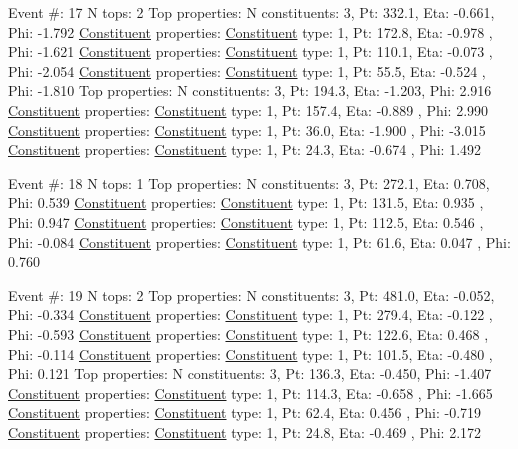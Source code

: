 \begin{DoxyCode}
Event #: 17
      N tops: 2
      Top properties: N constituents:   3,   Pt:  332.1,   Eta:  -0.661,   Phi:  -1.792
          \hyperlink{classConstituent}{Constituent} properties: \hyperlink{classConstituent}{Constituent} type:   1,   Pt:  172.8,   Eta:  -0.978
      ,   Phi:  -1.621
          \hyperlink{classConstituent}{Constituent} properties: \hyperlink{classConstituent}{Constituent} type:   1,   Pt:  110.1,   Eta:  -0.073
      ,   Phi:  -2.054
          \hyperlink{classConstituent}{Constituent} properties: \hyperlink{classConstituent}{Constituent} type:   1,   Pt:   55.5,   Eta:  -0.524
      ,   Phi:  -1.810
      Top properties: N constituents:   3,   Pt:  194.3,   Eta:  -1.203,   Phi:   2.916
          \hyperlink{classConstituent}{Constituent} properties: \hyperlink{classConstituent}{Constituent} type:   1,   Pt:  157.4,   Eta:  -0.889
      ,   Phi:   2.990
          \hyperlink{classConstituent}{Constituent} properties: \hyperlink{classConstituent}{Constituent} type:   1,   Pt:   36.0,   Eta:  -1.900
      ,   Phi:  -3.015
          \hyperlink{classConstituent}{Constituent} properties: \hyperlink{classConstituent}{Constituent} type:   1,   Pt:   24.3,   Eta:  -0.674
      ,   Phi:   1.492

Event #: 18
      N tops: 1
      Top properties: N constituents:   3,   Pt:  272.1,   Eta:   0.708,   Phi:   0.539
          \hyperlink{classConstituent}{Constituent} properties: \hyperlink{classConstituent}{Constituent} type:   1,   Pt:  131.5,   Eta:   0.935
      ,   Phi:   0.947
          \hyperlink{classConstituent}{Constituent} properties: \hyperlink{classConstituent}{Constituent} type:   1,   Pt:  112.5,   Eta:   0.546
      ,   Phi:  -0.084
          \hyperlink{classConstituent}{Constituent} properties: \hyperlink{classConstituent}{Constituent} type:   1,   Pt:   61.6,   Eta:   0.047
      ,   Phi:   0.760

Event #: 19
      N tops: 2
      Top properties: N constituents:   3,   Pt:  481.0,   Eta:  -0.052,   Phi:  -0.334
          \hyperlink{classConstituent}{Constituent} properties: \hyperlink{classConstituent}{Constituent} type:   1,   Pt:  279.4,   Eta:  -0.122
      ,   Phi:  -0.593
          \hyperlink{classConstituent}{Constituent} properties: \hyperlink{classConstituent}{Constituent} type:   1,   Pt:  122.6,   Eta:   0.468
      ,   Phi:  -0.114
          \hyperlink{classConstituent}{Constituent} properties: \hyperlink{classConstituent}{Constituent} type:   1,   Pt:  101.5,   Eta:  -0.480
      ,   Phi:   0.121
      Top properties: N constituents:   3,   Pt:  136.3,   Eta:  -0.450,   Phi:  -1.407
          \hyperlink{classConstituent}{Constituent} properties: \hyperlink{classConstituent}{Constituent} type:   1,   Pt:  114.3,   Eta:  -0.658
      ,   Phi:  -1.665
          \hyperlink{classConstituent}{Constituent} properties: \hyperlink{classConstituent}{Constituent} type:   1,   Pt:   62.4,   Eta:   0.456
      ,   Phi:  -0.719
          \hyperlink{classConstituent}{Constituent} properties: \hyperlink{classConstituent}{Constituent} type:   1,   Pt:   24.8,   Eta:  -0.469
      ,   Phi:   2.172


\end{DoxyCode}
